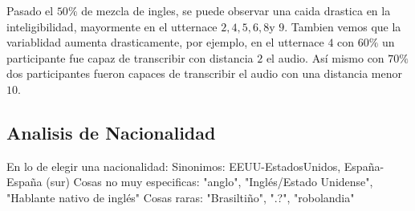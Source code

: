 Pasado el $50\%$ de mezcla de ingles, se puede observar una caida drastica en la inteligibilidad, mayormente en el utternace $2, 4, 5, 6, 8$y $9$. Tambien vemos que la variablidad aumenta drasticamente, por ejemplo, en el utternace $4$ con $60\%$ un participante fue capaz de transcribir con distancia $2$ el audio. Así mismo con $70\%$ dos participantes fueron capaces de transcribir el audio con una distancia menor $10$.


\subsection{Analisis de Nacionalidad}

En lo de elegir una nacionalidad:
Sinonimos: EEUU-EstadosUnidos, España-España (sur)
Cosas no muy especificas: "anglo", "Inglés/Estado Unidense", "Hablante nativo de inglés"
Cosas raras: "Brasiltiño", ".?", "robolandia"
